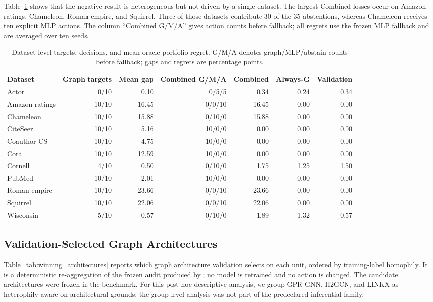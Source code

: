Table~\ref{tab:dataset_decisions} shows that the negative result is heterogeneous but not driven by a single dataset. The largest Combined losses occur on Amazon-ratings, Chameleon, Roman-empire, and Squirrel. Three of those datasets contribute 30 of the 35 abstentions, whereas Chameleon receives ten explicit MLP actions. The column ``Combined G/M/A'' gives action counts before fallback; all regrets use the frozen MLP fallback and are averaged over ten seeds.

\begin{table}[ht]
\centering
\caption{Dataset-level targets, decisions, and mean oracle-portfolio regret. G/M/A denotes graph/MLP/abstain counts before fallback; gaps and regrets are percentage points.}
\label{tab:dataset_decisions}
\scriptsize
\setlength{\tabcolsep}{3.0pt}
\begin{tabular}{@{}lrrrrrr@{}}
\toprule
Dataset & Graph targets & Mean gap & Combined G/M/A & Combined & Always-G & Validation \\
\midrule
Actor & 0/10 & 0.10 & 0/5/5 & 0.34 & 0.24 & 0.34 \\
Amazon-ratings & 10/10 & 16.45 & 0/0/10 & 16.45 & 0.00 & 0.00 \\
Chameleon & 10/10 & 15.88 & 0/10/0 & 15.88 & 0.00 & 0.00 \\
CiteSeer & 10/10 & 5.16 & 10/0/0 & 0.00 & 0.00 & 0.00 \\
Coauthor-CS & 10/10 & 4.75 & 10/0/0 & 0.00 & 0.00 & 0.00 \\
Cora & 10/10 & 12.59 & 10/0/0 & 0.00 & 0.00 & 0.00 \\
Cornell & 4/10 & 0.50 & 0/10/0 & 1.75 & 1.25 & 1.50 \\
PubMed & 10/10 & 2.01 & 10/0/0 & 0.00 & 0.00 & 0.00 \\
Roman-empire & 10/10 & 23.66 & 0/0/10 & 23.66 & 0.00 & 0.00 \\
Squirrel & 10/10 & 22.06 & 0/0/10 & 22.06 & 0.00 & 0.00 \\
Wisconsin & 5/10 & 0.57 & 0/10/0 & 1.89 & 1.32 & 0.57 \\
\bottomrule
\end{tabular}
\end{table}

\subsection{Validation-Selected Graph Architectures}

Table~\ref{tab:winning_architectures} reports which graph architecture validation selects on each unit, ordered by training-label homophily. It is a deterministic re-aggregation of the frozen audit produced by ; no model is retrained and no action is changed. The candidate architectures were frozen in the benchmark. For this post-hoc descriptive analysis, we group GPR-GNN, H2GCN, and LINKX as heterophily-aware on architectural grounds; the group-level analysis was not part of the predeclared inferential family.

